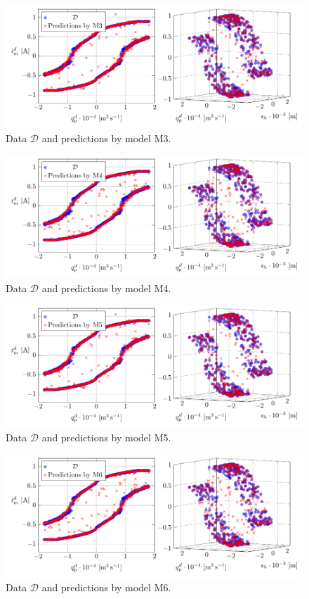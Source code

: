 \begin{figure}[H]
	\centering 
	\includegraphics{graphics/pgfplots/cha5/Bosch/M3.pdf}
	\caption{Data $\mathcal{D}$ and predictions by model M3.}
	\label{fig:bosch-M3}
\end{figure}

\begin{figure}[H]
	\centering 
	\includegraphics{graphics/pgfplots/cha5/Bosch/M4.pdf}
	\caption{Data $\mathcal{D}$ and predictions by model M4.}
	\label{fig:bosch-M4}
\end{figure}

\begin{figure}[H]
	\centering 
	\includegraphics{graphics/pgfplots/cha5/Bosch/M5.pdf}
	\caption{Data $\mathcal{D}$ and predictions by model M5.}
	\label{fig:bosch-M5}
\end{figure}

\begin{figure}[H]
	\centering 
	\includegraphics{graphics/pgfplots/cha5/Bosch/M6.pdf}
	\caption{Data $\mathcal{D}$ and predictions by model M6.}
	\label{fig:bosch-M6}
\end{figure}

